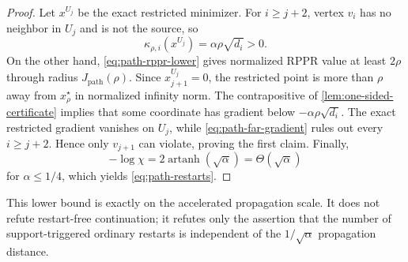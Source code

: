 \begin{proof}
Let $x^{U_j}$ be the exact restricted minimizer.  For $i\geq j+2$, vertex
$v_i$ has no neighbor in $U_j$ and is not the source, so
\begin{equation}
  \kappa_{\rho,i}(x^{U_j})=\alpha\rho\sqrt{d_i}>0.
  \label{eq:path-far-gradient}
\end{equation}
On the other hand, \cref{eq:path-rppr-lower} gives normalized RPPR value at
least $2\rho$ through radius $J_{\mathrm{path}}(\rho)$. Since
$x^{U_j}_{j+1}=0$, the
restricted point is more than $\rho$ away from $x_\rho^\star$ in normalized
infinity norm.  The contrapositive of \cref{lem:one-sided-certificate} implies
that some coordinate has gradient below $-\alpha\rho\sqrt{d_i}$.  The exact
restricted gradient vanishes on $U_j$, while
\cref{eq:path-far-gradient} rules out every $i\geq j+2$.  Hence only
$v_{j+1}$ can violate, proving the first claim.  Finally,
\begin{equation}
  -\log\chi
  =2\operatorname{artanh}(\sqrt\alpha)
  =\Theta(\sqrt\alpha)
\end{equation}
for $\alpha\leq1/4$, which yields \cref{eq:path-restarts}.
\end{proof}

This lower bound is exactly on the accelerated propagation scale.  It does
not refute restart-free continuation; it refutes only the assertion that the
number of support-triggered ordinary restarts is independent of the
$1/\sqrt\alpha$ propagation distance.
